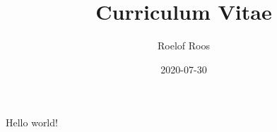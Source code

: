 \documentclass{article}[A4]
\title{Curriculum Vitae}
\date{2020-07-30}
\author{Roelof Roos}
\begin{document}
    \maketitle
    \newpage

    Hello world!
\end{document}
